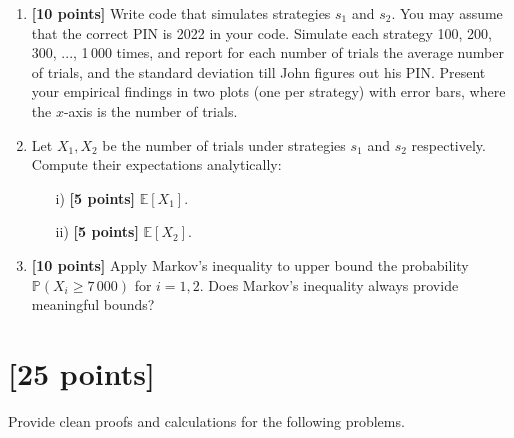 \begin{tcolorbox}
\begin{enumerate}
    \item  {\bf [10 points] } Write code that simulates strategies $s_1$ and $s_2$. You may assume that the correct PIN is 2022 in your code. Simulate each strategy 100, 200, 300, ..., 1\,000 times, and report for each number of trials the average number of trials, and the standard deviation till John figures out his PIN. Present your empirical findings in two plots (one per strategy) with error bars, where the $x$-axis is the number of trials.  
    \item  Let $X_1,X_2$ be the number of trials under strategies $s_1$ and $s_2$ respectively. Compute their expectations analytically: 
    \begin{itemize}
        \item[i)]   {\bf [5 points] }$ \mathbb{E}[X_1]$.
        \item[ii)]  {\bf [5 points] } $ \mathbb{E}[X_2]$.
    \end{itemize} 


\item  {\bf [10 points] } Apply Markov's inequality to upper bound the probability $\mathbb{P}(X_i \geq 7\,000)$ for $i=1,2$.  Does Markov's inequality always provide meaningful bounds?
\end{enumerate}
\end{tcolorbox}

\newpage 

\section{ [25 points]} 
 

Provide clean proofs and calculations for the following problems. 

